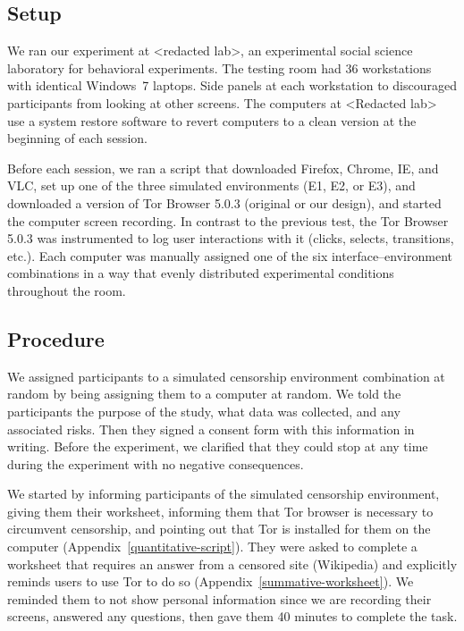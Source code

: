 \documentclass[USenglish,oneside,twocolumn]{article}
\begin{document}
\subsection{Setup}
We ran our experiment at <redacted lab>, an experimental social science laboratory for behavioral experiments. The testing room had 36 workstations with identical Windows~7 laptops. Side panels at each workstation to discouraged participants from looking at other screens. 
The computers at <Redacted lab> use a system restore software to revert computers to a clean version at the beginning of each session. 

Before each session, we ran a script that downloaded Firefox, Chrome, IE, and VLC, set up one of the three simulated environments (E1, E2, or E3), and downloaded a version of Tor Browser 5.0.3 (original or our design), and started the computer screen recording. In contrast to the previous test, the Tor Browser 5.0.3 was instrumented to log user interactions with it (clicks, selects, transitions, etc.). Each computer was manually assigned one of the six interface--environment combinations in a way that evenly distributed experimental conditions throughout the room.

\subsection{Procedure}
We assigned participants  to a simulated censorship environment combination at random by being assigning them to a computer at random. We told the participants the purpose of the study, what data was collected, and any associated risks. Then they signed a consent form with this information in writing. Before the experiment, we clarified that they could stop at any time during the experiment with no negative consequences. 

We started by informing participants of the simulated censorship environment, giving them their worksheet,  informing them that Tor browser is necessary to circumvent censorship, and pointing out that Tor is installed for them on the computer (Appendix~\ref{quantitative-script}). They were asked to complete a worksheet that requires an answer from a censored site (Wikipedia) and explicitly reminds users to use Tor to do so (Appendix~\ref{summative-worksheet}). We reminded them to not show personal information since we are recording their screens, answered any questions, then gave them 40 minutes to complete the task. 
\end{document}
